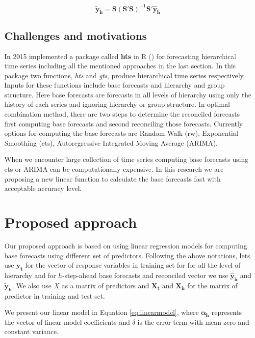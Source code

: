 \documentclass[11pt,a4paper,]{article}
\begin{document}
\begin{equation}\label{eq:reconciledforecasts}
   \mathbf{\tilde{y}_{h}}=\mathbf{S(S'S)^{-1}S'}\mathbf{\hat{y}_h}
\end{equation}

\subsection{Challenges and
motivations}\label{challenges-and-motivations}

In 2015 \textcite{hyndman2015hts} implemented a package called
\textbf{hts} in R (\textcite{team2013r}) for forecasting hierarchical
time series including all the mentioned approaches in the last section.
In this package two functions, \emph{hts} and \emph{gts}, produce
hierarchical time series respectively. Inputs for these functions
include base forecasts and hierarchy and group structure. Here base
forecasts are forecasts in all levels of hierarchy using only the
history of each series and ignoring hierarchy or group structure. In
optimal combination method, there are two steps to determine the
reconciled forecasts first computing base forecasts and second
reconciling those forecasts. Currently options for computing the base
forecasts are Random Walk (rw), Exponential Smoothing (ets),
Autoregressive Integrated Moving Average (ARIMA).

When we encounter large collection of time series computing base
forecasts using ets or ARIMA can be computationally expensive. In this
research we are proposing a new linear function to calculate the base
forecasts fast with acceptable accuracy level.

\section{Proposed approach}\label{proposed-approach}

Our proposed approach is based on using linear regression models for
computing base forecasts using different set of predictors. Following
the above notations, lets use \(\mathbf{y_t}\) for the vector of
response variables in training set for for all the level of hierarchy
and for \(h\)-step-ahead base forecasts and reconciled vector we use
\(\mathbf{\widehat{y}_{h}}\) and \(\mathbf{\tilde{y}_{h}}\). We also use
\(X\) as a matrix of predictors and \(\mathbf{X_t}\) and
\(\mathbf{X_h}\) for the matrix of predictor in training and test set.

We present our linear model in Equation \eqref{eq:linearmodel}, where
\(\boldsymbol{\alpha_h}\) represents the vector of linear model
coefficients and \(\delta\) is the error term with mean zero and
constant variance.
\end{document}
